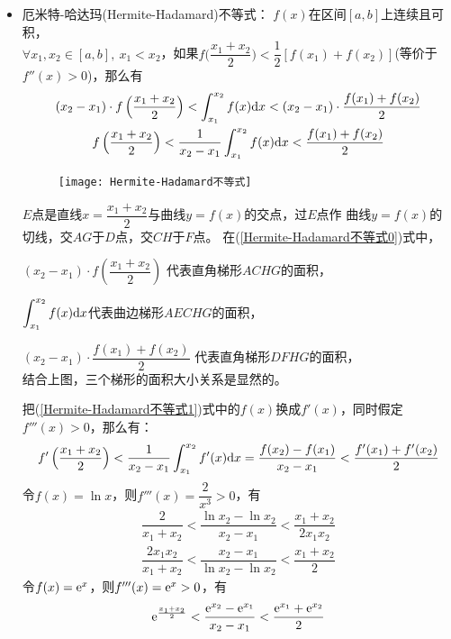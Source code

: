 \begin{itemize}[leftmargin=\inteval{\myitemleftmargin}pt,itemsep=
   \inteval{\myitemitempsep}pt,topsep=\inteval{\myitemtopsep}pt]
\item 厄米特-哈达玛(Hermite-Hadamard)不等式：
$ f(x) $在区间$ [a,b] $上连续且可积，\\ $ \forall x_1,x_2\in [a,b],\ 
x_1<x_2 $，如果$ f\Big(\dfrac{x_1+x_2}{2}\Big)<
\dfrac{1}{2}[f(x_1)+f(x_2)] $(等价于$ f''(x)>0 $)，那么有 
\begin{gather}
    (x_2-x_1)\cdot f\left(\dfrac{x_1+x_2}{2}\right)<
    \int_{x_1}^{x_2}f(x)\mathrm{d} x<(x_2-x_1)\cdot \dfrac{f(x_1)+f(x_2)}{2} 
    \label{Hermite-Hadamard不等式0} \\
    f\left(\dfrac{x_1+x_2}{2}\right)<\dfrac{1}{x_2-x_1}
    \int_{x_1}^{x_2}f(x)\mathrm{d} x< \dfrac{f(x_1)+f(x_2)}{2}
    \label{Hermite-Hadamard不等式1}
\end{gather}
\begin{figure}[H]
    \centering
    \texttt{[image: Hermite-Hadamard不等式]}
\end{figure}
$ E $点是直线$ x=\dfrac{x_1+x_2}{2} $与曲线$ y=f(x) $的交点，过$ E $点作
曲线$ y=f(x) $的切线，交$ AG $于$ D $点，交$ CH $于$ F $点。
在(\ref{Hermite-Hadamard不等式0})式中，

\hspace{0.6cm} $ (x_2-x_1)\cdot f\left(\dfrac{x_1+x_2}{2}\right) $
代表直角梯形$ ACHG $的面积，

\hspace{0.6cm} $ \displaystyle \int_{x_1}^{x_2}f(x)\mathrm{d} x $代表曲边梯形$ AECHG $的面积，

\hspace{0.6cm} $ (x_2-x_1)\cdot \dfrac{f(x_1)+f(x_2)}{2} $
代表直角梯形$ DFHG $的面积，\\
结合上图，三个梯形的面积大小关系是显然的。

把(\ref{Hermite-Hadamard不等式1})式中的$ f(x) $换成$ f'(x) $，同时假定$ f'''(x)>0 $，那么有：
\begin{align}\label{Hermite-Hadamard不等式2}
    f'\left(\dfrac{x_1+x_2}{2}\right)<\dfrac{1}{x_2-x_1}
    \int_{x_1}^{x_2}f'(x)\mathrm{d} x=\dfrac{f(x_2)-f(x_1)}{x_2-x_1}< \dfrac{f'(x_1)+f'(x_2)}{2}
\end{align}
令$ f(x)=\ln x $，则$ f'''(x)=\dfrac{2}{x^3}>0 $，有
\begin{gather*}
    \dfrac{2}{x_1+x_2}<\dfrac{\ln x_2-\ln x_2}
    {x_2-x_1}<\dfrac{x_1+x_2}{2x_1x_2} \\
    \dfrac{2x_1x_2}{x_1+x_2}<\dfrac{x_2-x_1}{\ln x_2-
        \ln x_2}<\dfrac{x_1+x_2}{2}
\end{gather*}
令$ f(x)=\mathrm{e}^x $，则$ f'''(x)=\mathrm{e}^x>0 $，有
\begin{gather*}
    \mathrm{e}^{\frac{x_1+x_2}{2}}<\dfrac{\mathrm{e}^{x_2}-\mathrm{e}^{x_1}}{x_2-x_1}<
    \dfrac{\mathrm{e}^{x_1}+\mathrm{e}^{x_2}}{2}
\end{gather*} 


\end{itemize}

